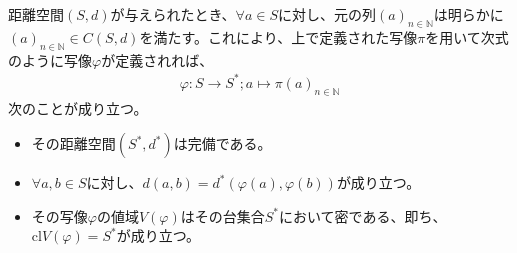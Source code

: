 \documentclass[dvipdfmx]{jsarticle}
\begin{document}
\begin{thm}\label{8.2.6.5}
距離空間$(S,d)$が与えられたとき、$\forall a \in S$に対し、元の列$(a)_{n \in \mathbb{N}}$は明らかに$(a)_{n \in \mathbb{N}} \in C(S,d)$を満たす。これにより、上で定義された写像$\pi$を用いて次式のように写像$\varphi$が定義されれば、
\begin{align*}
\varphi:S \rightarrow S^{*};a \mapsto \pi(a)_{n \in \mathbb{N}}
\end{align*}
次のことが成り立つ。
\begin{itemize}
\item
  その距離空間$\left( S^{*},d^{*} \right)$は完備である。
\item
  $\forall a,b \in S$に対し、$d(a,b) = d^{*}\left( \varphi(a),\varphi(b) \right)$が成り立つ。
\item
  その写像$\varphi$の値域$V(\varphi)$はその台集合$S^{*}$において密である、即ち、${\mathrm{cl}}{V(\varphi)} = S^{*}$が成り立つ。
\end{itemize}
\end{thm}
\end{document}
